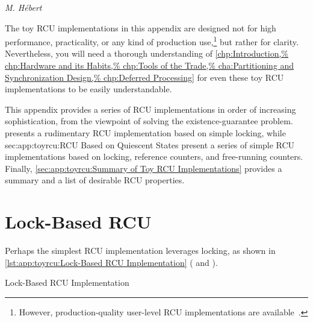 
%
	 {\emph{M. H\'ebert}}

The toy RCU implementations in this appendix are designed not for
high performance, practicality, or any kind of production use,\footnote{
	However, production-quality user-level RCU implementations
	are available~\cite{MathieuDesnoyers2009URCU,MathieuDesnoyers2012URCU}.}
but rather for clarity.
Nevertheless, you will need a thorough understanding of
\cref{chp:Introduction,%
chp:Hardware and its Habits,%
chp:Tools of the Trade,%
cha:Partitioning and Synchronization Design,%
chp:Deferred Processing}
for even these toy RCU implementations to be easily understandable.

This appendix provides a series of RCU implementations in order of
increasing sophistication, from the viewpoint of solving the
existence-guarantee problem.
 presents a rudimentary
RCU implementation based on simple locking, while
{sec:app:toyrcu:RCU Based on Quiescent States}
present a series of
simple RCU implementations based on locking, reference counters,
and free-running counters.
Finally, \cref{sec:app:toyrcu:Summary of Toy RCU Implementations}
provides a summary and a list of desirable RCU properties.

\section{Lock-Based RCU}
\label{sec:app:toyrcu:Lock-Based RCU}

Perhaps the simplest RCU implementation leverages locking, as
shown in
\cref{lst:app:toyrcu:Lock-Based RCU Implementation}
( and ).

\begin{listing}
\vspace*{-11pt}
\caption{Lock-Based RCU Implementation}
\label{lst:app:toyrcu:Lock-Based RCU Implementation}
\end{listing}

